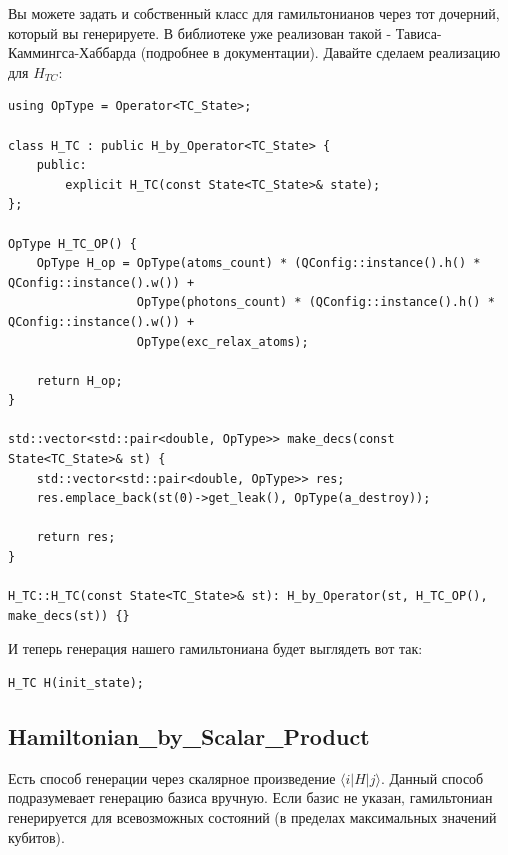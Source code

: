 \documentclass[12pt,fleqn]{article}
\begin{document}
        Вы можете задать и собственный класс для гамильтонианов через тот дочерний, который вы генерируете. В библиотеке уже реализован такой - Тависа-Каммингса-Хаббарда (подробнее в документации). 
        Давайте сделаем реализацию для $H_{TC}$:

\begin{mdframed}[linecolor=black, topline=true, bottomline=true,
leftline=false, rightline=false]
\begin{verbatim}
using OpType = Operator<TC_State>;

class H_TC : public H_by_Operator<TC_State> {
    public:
        explicit H_TC(const State<TC_State>& state);
};

OpType H_TC_OP() {
    OpType H_op = OpType(atoms_count) * (QConfig::instance().h() * QConfig::instance().w()) + 
                  OpType(photons_count) * (QConfig::instance().h() * QConfig::instance().w()) +
                  OpType(exc_relax_atoms);

    return H_op;
}

std::vector<std::pair<double, OpType>> make_decs(const State<TC_State>& st) {
    std::vector<std::pair<double, OpType>> res;
    res.emplace_back(st(0)->get_leak(), OpType(a_destroy));

    return res;
}

H_TC::H_TC(const State<TC_State>& st): H_by_Operator(st, H_TC_OP(), make_decs(st)) {}
\end{verbatim}
\end{mdframed}

        И теперь генерация нашего гамильтониана будет выглядеть вот так:

\begin{mdframed}[linecolor=black, topline=true, bottomline=true,
leftline=false, rightline=false]
\begin{verbatim}
H_TC H(init_state);
\end{verbatim}
\end{mdframed}

        \subsection{\textbf{Hamiltonian\_by\_Scalar\_Product}}

        Есть способ генерации через скалярное произведение $\langle{i}|H|j\rangle$. Данный способ подразумевает генерацию базиса вручную. Если базис не указан,
        гамильтониан генерируется для всевозможных состояний (в пределах максимальных значений кубитов).
\end{document}

